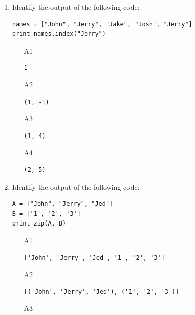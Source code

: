 \begin{enumerate}
\begin{enumerate}
\item[A1] 
\begin{verbatim}
1
\end{verbatim}
\item[A2] 
\begin{verbatim}
2
\end{verbatim}
\item[A3] 
\begin{verbatim}
(1, 4)
\end{verbatim}
\item[A4] 
\begin{verbatim}
(2, 5)
\end{verbatim}
\end{enumerate}
\item Identify the output of the following code:
\begin{verbatim}
names = ["John", "Jerry", "Jake", "Josh", "Jerry"]
print names.index("Jerry")
\end{verbatim}
\begin{enumerate}
\item[A1] 
\begin{verbatim}
1
\end{verbatim}
\item[A2] 
\begin{verbatim}
(1, -1)
\end{verbatim}
\item[A3] 
\begin{verbatim}
(1, 4)
\end{verbatim}
\item[A4] 
\begin{verbatim}
(2, 5)
\end{verbatim}
\end{enumerate}
\item Identify the output of the following code:
\begin{verbatim}
A = ["John", "Jerry", "Jed"]
B = ['1', '2', '3']
print zip(A, B)
\end{verbatim}
\begin{enumerate}
\item[A1] 
\begin{verbatim}
['John', 'Jerry', 'Jed', '1', '2', '3']
\end{verbatim}
\item[A2] 
\begin{verbatim}
[('John', 'Jerry', 'Jed'), ('1', '2', '3')]
\end{verbatim}
\item[A3] 

\end{enumerate}
\end{enumerate}
